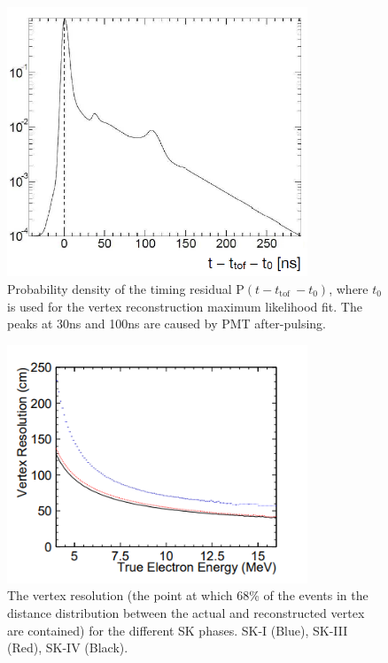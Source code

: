 \begin{figure}
    \centering
    \includegraphics[width=0.8\textwidth]{Figures/bonsai_pdf_res.png}
\caption{Probability density of the timing residual P$(t-t_{\text {tof }}-t_{0})$, where $t_{0}$ is used for the vertex reconstruction maximum likelihood fit. The peaks at 30ns and 100ns are caused by PMT after-pulsing.}
    \label{fig:bonsaihittof}
\end{figure}

\begin{figure}
    \centering
    \includegraphics[width=0.8\textwidth]{Figures/bonsai_vertex_res.png}
\caption{The vertex resolution (the point at which 68\% of the events in the distance distribution between the actual and reconstructed vertex are contained) for the different SK phases. SK-I (Blue), SK-III (Red), SK-IV (Black).}
    \label{fig:bonsaivertexres}
\end{figure}

